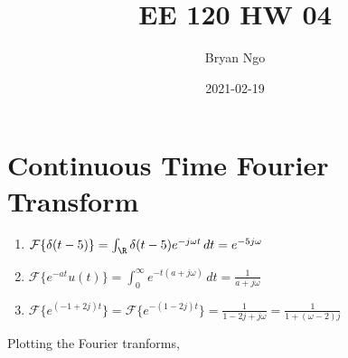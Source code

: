 \documentclass{article}
\title{EE 120 HW 04}
\author{Bryan Ngo}
\date{2021-02-19}
\newcommand{\F}{\mathcal{F}}
\begin{document}
\maketitle

\section{Continuous Time Fourier Transform}

\begin{enumerate}
    \item \(\F\{\delta(t - 5)\} = \int_{\R} \delta(t - 5) e^{-j \omega t} \, dt = e^{-5j \omega}\)
    \item \(\F\{e^{-at} u(t)\} = \int_0^\infty e^{-t (a + j \omega)} \, dt = \frac{1}{a + j \omega}\)
    \item \(\F\{e^{(-1 + 2j) t}\} = \F\{e^{-(1 - 2j) t}\} = \frac{1}{1 - 2j + j \omega} = \frac{1}{1 + (\omega - 2) j}\)
\end{enumerate}
Plotting the Fourier tranforms,
\end{document}
